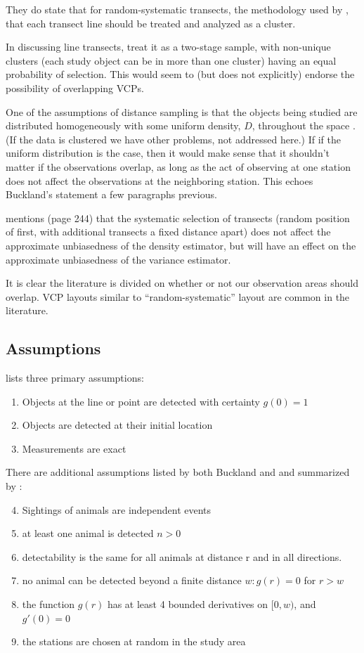 \documentclass[12pt]{article}
\begin{document}
They do state that for random-systematic transects, the methodology used by \textcite{micronesian}, that each transect line should be treated and analyzed as a cluster.

In discussing line transects, \textcite{barry2001} treat it as a two-stage sample, with non-unique clusters (each study object can be in more than one cluster) having an equal probability of selection. This would seem to (but does not explicitly) endorse the possibility of overlapping VCPs. 

One of the assumptions of distance sampling is that the objects being studied are distributed homogeneously with some uniform density, $D$, throughout the space \textcite{ramsey1981}.  (If the data is clustered we have other problems, not addressed here.) If if the uniform distribution is the case, then it would make sense that it shouldn't matter if the observations overlap, as long as the act of observing at one station does not affect the observations at the neighboring station. This echoes Buckland’s statement a few paragraphs previous.

\textcite[244]{thompson2012} mentions (page 244) that the systematic selection of transects (random position of first, with additional transects a fixed distance apart) does not affect the approximate unbiasedness of the density estimator, but will have an effect on the approximate unbiasedness of the variance estimator. 

It is clear the literature is divided on whether or not our observation areas should overlap. VCP layouts similar to \textcite{micronesian} ``random-systematic'' layout are common in the literature.


\subsection{Assumptions}
\textcite{buckland2001} lists three primary assumptions:
\begin{enumerate}
	\item Objects at the line or point are detected with certainty $g(0)=1$
	\item Objects are detected at their initial location
	\item Measurements are exact
\end{enumerate}

There are additional assumptions listed by both Buckland and \textcite{ramsey1979} and summarized by \textcite{quang1993}:
\begin{enumerate}
	\setcounter{enumi}{3}
	\item Sightings of animals are independent events
	\item at least one animal is detected $n > 0$
	\item detectability is the same for all animals at distance r and in all directions.
	\item no animal can be detected beyond a finite distance $w: g(r) = 0$ for $r > w$
	\item the function $g(r)$ has at least 4 bounded derivatives on $[0, w)$, and $g'(0)=0$
	\item the stations are chosen at random in the study area
\end{enumerate}
\end{document}
